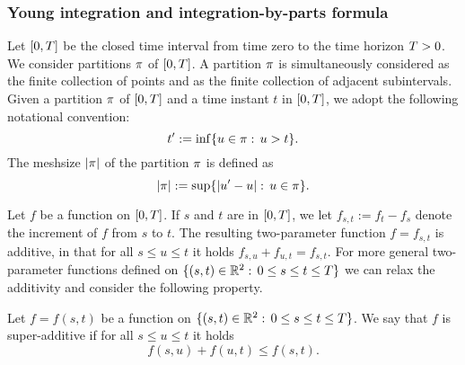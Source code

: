 \documentclass[10pt,a4paper]{article}
\begin{document}
\begin{appendices}
\subsubsection*{Young integration and integration-by-parts formula}
 Let ${[0,T]}$ be the closed time interval from time zero to the time horizon $T>0$. We consider partitions $\pi$ of ${[0,T]}$. 
 A partition $\pi$ is simultaneously considered  as the finite collection of points and as the finite collection of adjacent subintervals. Given a partition $\pi$ of ${[0,T]}$ and a time instant $t$ in ${[0,T]}$,  we adopt the following notational convention: 
 \begin{equation}\label{eq.notationAboutPartition}
 t^{\prime}:=  \inf \lbrace u \in \pi : \, u> t \rbrace .
 \end{equation} 
 The meshsize $\left\lvert {\pi} \right\rvert$ of the partition $\pi$ is defined as 
 \begin{equation*}
 \left\lvert {\pi} \right\rvert :=  \sup \lbrace \left\lvert {u^{\prime}- u} \right\rvert: \, u \in \pi \rbrace.
 \end{equation*}
 
Let $f$ be a function on ${[0,T]}$. If $s$ and $t$ are  in ${[0,T]}$,  we let $f_{s,t}:=f_t - f_s$ denote  the increment of $f$ from $s$ to $t$. The resulting two-parameter function $f=f_{s,t}$ is additive, in that for all $s\leq u\leq t$ it holds $f_{s,u} + f_{u,t} = f_{s,t}$. For more general two-parameter functions  defined on $\lbrace (s,t) \in \mathbb{R}^{2}:\, 0 \leq s \leq t \leq T \rbrace$ we can relax the additivity and consider the following property. 
\begin{defi}
Let $f=f(s,t)$ be a function on $\lbrace (s,t) \in \mathbb{R}^{2}:\, 0 \leq s \leq t \leq T \rbrace$. We say that $f$ is super-additive if  for all $s\leq u\leq t$ it holds 
\begin{equation*}
f(s,u) + f(u,t) \leq f(s,t). 
\end{equation*}
\end{defi}


\end{appendices}
\end{document}
